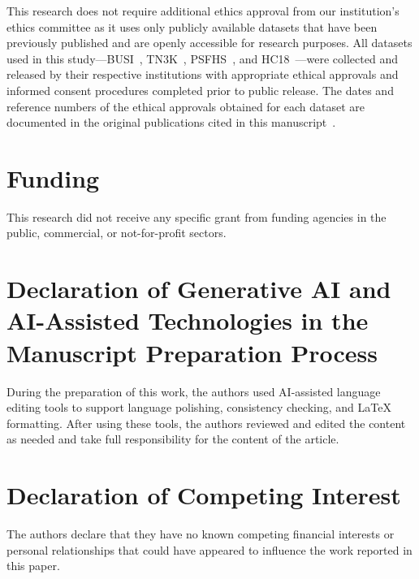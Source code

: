 \documentclass[a4paper,fleqn]{cas-dc}
\begin{document}
This research does not require additional ethics approval from our institution's ethics committee as it uses only publicly available datasets that have been previously published and are openly accessible for research purposes. All datasets used in this study—BUSI~\cite{b1}, TN3K~\cite{b4}, PSFHS~\cite{b53}, and HC18~\cite{b54}—were collected and released by their respective institutions with appropriate ethical approvals and informed consent procedures completed prior to public release. The dates and reference numbers of the ethical approvals obtained for each dataset are documented in the original publications cited in this manuscript~\cite{b1,b4,b53,b54}.

\section{Funding}

This research did not receive any specific grant from funding agencies in the public, commercial, or not-for-profit sectors.

\section{Declaration of Generative AI and AI-Assisted Technologies in the Manuscript Preparation Process}

During the preparation of this work, the authors used AI-assisted language editing tools to support language polishing, consistency checking, and LaTeX formatting. After using these tools, the authors reviewed and edited the content as needed and take full responsibility for the content of the article.

\section{Declaration of Competing Interest}

The authors declare that they have no known competing financial interests or personal relationships that could have appeared to influence the work reported in this paper.

\printcredits

%



\end{document}
